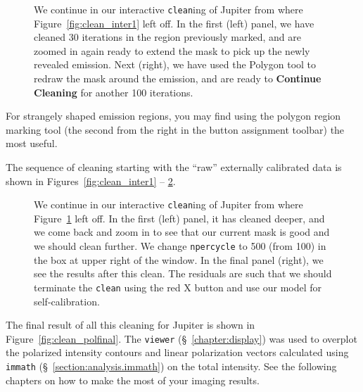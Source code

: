 \begin{figure}[h!]
\begin{center}
\caption{\label{fig:clean_inter2} We continue in our interactive 
{\tt clean}ing of Jupiter from where Figure~\ref{fig:clean_inter1}
left off.  In the first (left) panel, we have cleaned 30 iterations
in the region previously marked, and are zoomed in again ready to
extend the mask to pick up the newly revealed emission. 
Next (right), we have used the Polygon
tool to redraw the mask around the emission, and are ready to 
{\bf Continue Cleaning} for another 100 iterations.} 
\hrulefill
\end{center}
\end{figure}

For strangely shaped emission regions, you may find using the polygon
region marking tool (the second from the right in the button
assignment toolbar) the most useful.
  
The sequence of cleaning starting with the ``raw'' externally
calibrated data is shown in
Figures~\ref{fig:clean_inter1} -- \ref{fig:clean_inter3}.

\begin{figure}[h!]
\begin{center}
\caption{\label{fig:clean_inter3} We continue in our interactive 
{\tt clean}ing of Jupiter from where Figure~\ref{fig:clean_inter2}
left off.  In the first (left) panel,  it has cleaned deeper, and
we come back and zoom in to see that our current mask is good and
we should clean further.  We change {\tt npercycle} to 500 (from 100)
in the box at upper right of the window.  In the final panel (right),
we see the results after this clean.  The residuals are such that we
should terminate the {\tt clean} using the red X button 
and use our model for self-calibration.} 
\hrulefill
\end{center}
\end{figure}

The final result of all this cleaning for Jupiter is shown in
Figure~\ref{fig:clean_polfinal}.  The {\tt viewer} 
(\S~\ref{chapter:display}) was used to overplot the polarized
intensity contours and linear polarization vectors calculated using
{\tt immath} (\S~\ref{section:analysis.immath}) on the total
intensity.  See the following chapters on how to make the most of
your imaging results.

